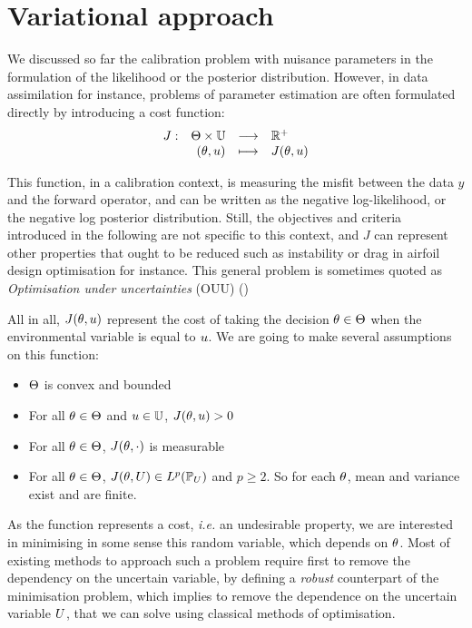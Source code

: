 \documentclass[../../Main_ManuscritThese.tex]{subfiles}
\begin{document}
\clearpage
\section{Variational approach}
\label{sec:J_rv}
We discussed so far the calibration problem with nuisance parameters
in the formulation of the likelihood or the posterior
distribution. However, in data assimilation for instance, problems of
parameter estimation are often formulated directly by introducing a
cost function:
\begin{equation}
  \begin{array}{rrcl}
    J: &\Theta \times \mathbb{U} &\longrightarrow& \mathbb{R}^+ \\
    &(\theta, u) &\longmapsto &J(\theta, u)
    \end{array}
  \end{equation}
  
  This function, in a calibration context, is measuring the misfit
  between the data $y$ and the forward operator, and can be written as
  the negative log-likelihood, or the negative log posterior
  distribution. Still, the objectives and criteria introduced in the
  following are not specific to this context, and $J$ can represent
  other properties that ought to be reduced such as instability or
  drag in airfoil design optimisation for instance. This general
  problem is sometimes quoted as \emph{Optimisation under
    uncertainties} (OUU)
  (\citep{cook_effective_2018,seshadri_density-matching_2014})


All in all, $J(\theta, u)$ represent the cost of taking the decision $\theta\in\Theta$ when the environmental variable is equal to $u$.
We are going to make several assumptions on this function:
\begin{itemize}
\item $\Theta$ is convex and bounded 
\item For all $\theta \in \Theta$ and $u \in \mathbb{U}$, $J(\theta, u)>0$
\item For all $\theta \in \Theta$, $J(\theta, \cdot)$ is measurable
\item For all $\theta \in \Theta$, $J(\theta, U) \in L^p(\mathbb{P}_{U})$ and $p \geq 2$. So for each $\theta$, mean and variance exist and are finite.
\end{itemize}

As the function represents a cost, \emph{i.e.} an undesirable
property, we are interested in minimising in some sense this random
variable, which depends on $\theta$.  Most of existing methods to
approach such a problem require first to remove the dependency on the
uncertain variable, by defining a \emph{robust} counterpart of the
minimisation problem, which implies to remove the dependence on the
uncertain variable $U$, that we can solve using classical methods of
optimisation.
\end{document}
